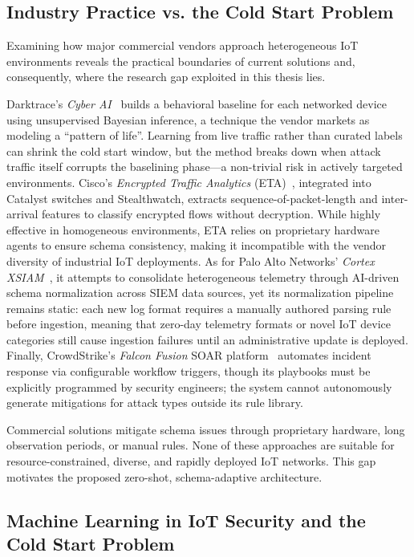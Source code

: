\documentclass[conference]{IEEEtran}
\begin{document}
\subsection{Industry Practice vs. the Cold Start Problem}

Examining how major commercial vendors approach heterogeneous IoT environments reveals the practical boundaries of current solutions and, consequently, where the research gap exploited in this thesis lies.

Darktrace's \textit{Cyber AI}~\cite{darktrace2024} builds a behavioral baseline for each networked device using unsupervised Bayesian inference, a technique the vendor markets as modeling a ``pattern of life''. Learning from live traffic rather than curated labels can shrink the cold start window, but the method breaks down when attack traffic itself corrupts the baselining phase---a non-trivial risk in actively targeted environments. Cisco's \textit{Encrypted Traffic Analytics} (ETA)~\cite{cisco_eta2024}, integrated into Catalyst switches and Stealthwatch, extracts sequence-of-packet-length and inter-arrival features to classify encrypted flows without decryption. While highly effective in homogeneous environments, ETA relies on proprietary hardware agents to ensure schema consistency, making it incompatible with the vendor diversity of industrial IoT deployments. As for Palo Alto Networks' \textit{Cortex XSIAM}~\cite{paloalto2024cortex}, it attempts to consolidate heterogeneous telemetry through AI-driven schema normalization across SIEM data sources, yet its normalization pipeline remains static: each new log format requires a manually authored parsing rule before ingestion, meaning that zero-day telemetry formats or novel IoT device categories still cause ingestion failures until an administrative update is deployed. Finally, CrowdStrike's \textit{Falcon Fusion} SOAR platform~\cite{crowdstrike2024} automates incident response via configurable workflow triggers, though its playbooks must be explicitly programmed by security engineers; the system cannot autonomously generate mitigations for attack types outside its rule library.

Commercial solutions mitigate schema issues through proprietary hardware, long observation periods, or manual rules. None of these approaches are suitable for resource-constrained, diverse, and rapidly deployed IoT networks. This gap motivates the proposed zero-shot, schema-adaptive architecture.

\subsection{Machine Learning in IoT Security and the Cold Start Problem}
\end{document}
